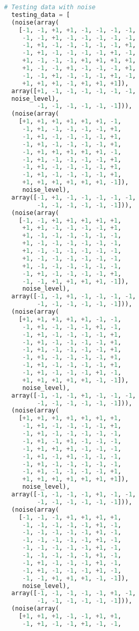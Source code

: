 \documentclass{article}
\begin{document}
\begin{lstlisting}[language=Python]
  # Testing data with noise
  testing_data = [
  (noise(array(
    [-1, -1, +1, +1, -1, -1, -1, -1, 
     -1, -1, +1, -1, -1, -1, -1, -1, 
     -1, +1, -1, -1, -1, -1, -1, +1, 
     -1, +1, -1, -1, -1, -1, +1, -1, 
     +1, -1, -1, -1, +1, +1, +1, +1, 
     +1, -1, -1, +1, -1, -1, -1, +1, 
     -1, -1, +1, -1, -1, -1, +1, -1, 
     +1, +1, +1, -1, +1, +1, +1]), 
  array([+1, -1, -1, -1, -1, -1, -1, 
  noise_level),
         -1, -1, -1, -1, -1, -1])),
  (noise(array(
    [+1, +1, +1, +1, +1, +1, -1, 
     -1, +1, -1, -1, -1, -1, +1, 
     -1, +1, -1, -1, -1, -1, +1, 
     -1, +1, -1, -1, -1, -1, +1, 
     -1, +1, +1, +1, +1, +1, -1, 
     -1, +1, -1, -1, -1, -1, +1, 
     -1, +1, -1, -1, -1, -1, +1, 
     -1, +1, -1, -1, -1, -1, +1, 
     +1, +1, +1, +1, +1, +1, -1]), 
     noise_level),
  array([-1, +1, -1, -1, -1, -1, -1, 
         -1, -1, -1, -1, -1, -1])),
  (noise(array(
    [-1, -1, +1, +1, +1, +1, +1, 
     +1, +1, -1, -1, -1, -1, +1, 
     +1, -1, -1, -1, -1, -1, -1, 
     +1, -1, -1, -1, -1, -1, -1, 
     +1, -1, -1, -1, -1, -1, -1, 
     +1, -1, -1, -1, -1, -1, -1, 
     +1, -1, -1, -1, -1, -1, -1, 
     -1, +1, -1, -1, -1, -1, +1, 
     -1, -1, +1, +1, +1, +1, -1]), 
     noise_level),
  array([-1, -1, +1, -1, -1, -1, -1, 
         -1, -1, -1, -1, -1, -1])),
  (noise(array(
    [+1, +1, +1, +1, +1, -1, -1, 
     -1, +1, -1, -1, -1, +1, -1, 
     -1, +1, -1, -1, -1, -1, +1, 
     -1, +1, -1, -1, -1, -1, +1, 
     -1, +1, -1, -1, -1, -1, +1, 
     -1, +1, -1, -1, -1, -1, +1,
     -1, +1, -1, -1, -1, -1, +1, 
     -1, +1, -1, -1, -1, +1, -1, 
     +1, +1, +1, +1, +1, -1, -1]), 
     noise_level),
  array([-1, -1, -1, +1, -1, -1, -1, 
         -1, -1, -1, -1, -1, -1])),
  (noise(array(
    [+1, +1, +1, +1, +1, +1, +1, 
     -1, +1, -1, -1, -1, -1, +1, 
     -1, +1, -1, -1, -1, -1, -1, 
     -1, +1, -1, +1, -1, -1, -1, 
     -1, +1, +1, +1, -1, -1, -1, 
     -1, +1, -1, +1, -1, -1, -1, 
     -1, +1, -1, -1, -1, -1, -1, 
     -1, +1, -1, -1, -1, -1, +1, 
     +1, +1, +1, +1, +1, +1, +1]), 
     noise_level),
  array([-1, -1, -1, -1, +1, -1, -1, 
         -1, -1, -1, -1, -1, -1])),
  (noise(array(
    [-1, -1, -1, +1, +1, +1, +1, 
     -1, -1, -1, -1, -1, +1, -1, 
     -1, -1, -1, -1, -1, +1, -1, 
     -1, -1, -1, -1, -1, +1, -1, 
     -1, -1, -1, -1, -1, +1, -1, 
     -1, -1, -1, -1, -1, +1, -1, 
     -1, +1, -1, -1, -1, +1, -1, 
     -1, +1, -1, -1, -1, +1, -1, 
     -1, -1, +1, +1, +1, -1, -1]), 
     noise_level),
  array([-1, -1, -1, -1, -1, +1, -1, 
         -1, -1, -1, -1, -1, -1])),
  (noise(array(
    [+1, +1, +1, -1, -1, +1, +1, 
     -1, +1, -1, -1, +1, -1, -1, 

\end{lstlisting}
\end{document}
